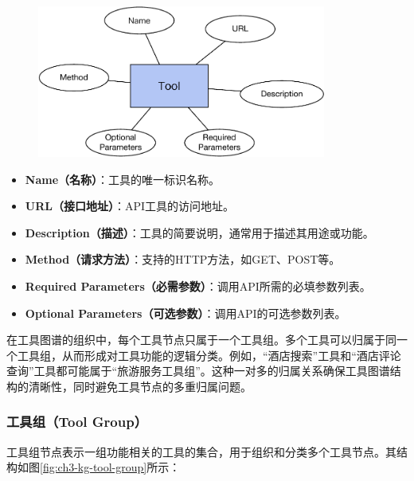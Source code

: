 \begin{figure}[!htp]
    \vspace{1em}
    \centering
    \setlength{\abovecaptionskip}{10pt} %
    \includegraphics[height=5cm]{../assets/图谱格式-tool.pdf}
    \label{fig:ch3-kg-tool}
  \end{figure}

\begin{itemize}
    \item \textbf{Name（名称）}：工具的唯一标识名称。
    \item \textbf{URL（接口地址）}：API工具的访问地址。
    \item \textbf{Description（描述）}：工具的简要说明，通常用于描述其用途或功能。
    \item \textbf{Method（请求方法）}：支持的HTTP方法，如GET、POST等。
    \item \textbf{Required Parameters（必需参数）}：调用API所需的必填参数列表。
    \item \textbf{Optional Parameters（可选参数）}：调用API的可选参数列表。
\end{itemize}

在工具图谱的组织中，每个工具节点只属于一个工具组。多个工具可以归属于同一个工具组，从而形成对工具功能的逻辑分类。例如，“酒店搜索”工具和“酒店评论查询”工具都可能属于“旅游服务工具组”。这种一对多的归属关系确保工具图谱结构的清晰性，同时避免工具节点的多重归属问题。

\subsubsection{工具组（Tool Group）}

工具组节点表示一组功能相关的工具的集合，用于组织和分类多个工具节点。其结构如图\ref{fig:ch3-kg-tool-group}所示：

